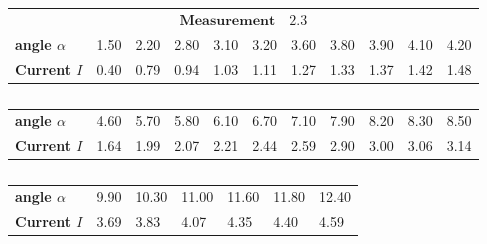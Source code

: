     \begin{table}[htdp]
        \begin{tabular}{|l||p{1.1cm}|p{1.1cm}|p{1.1cm}|p{1.1cm}|p{1.1cm}|p{1.1cm}|p{1.1cm}|p{1.1cm}|p{1.1cm}|p{1.1cm}|}
        \hline
            \multicolumn{11}{|c|}{\cellcolor[RGB]{206,250,201}$
            \mathbf{Measurement \quad 2.3}$} \\
\textbf{angle $\alpha$}& 1.50& 2.20& 2.80& 3.10& 3.20& 3.60& 3.80& 3.90& 4.10& 4.20 \\
\textbf{Current $I$}& 0.40& 0.79& 0.94& 1.03& 1.11& 1.27& 1.33& 1.37& 1.42& 1.48 \\

        \hline
        \end{tabular}
        \begin{tabular}{|l||p{1.1cm}|p{1.1cm}|p{1.1cm}|p{1.1cm}|p{1.1cm}|p{1.1cm}|p{1.1cm}|p{1.1cm}|p{1.1cm}|p{1.1cm}|}
        \hline\textbf{angle $\alpha$}& 4.60& 5.70& 5.80& 6.10& 6.70& 7.10& 7.90& 8.20& 8.30& 8.50 \\
\textbf{Current $I$}& 1.64& 1.99& 2.07& 2.21& 2.44& 2.59& 2.90& 3.00& 3.06& 3.14 \\

        \hline
        \end{tabular}
    \begin{tabular}{|l||p{1.1cm}|p{1.1cm}|p{1.1cm}|p{1.1cm}|p{1.1cm}|p{1.1cm}|}
    \hline\textbf{angle $\alpha$}& 9.90& 10.30& 11.00& 11.60& 11.80& 12.40 \\
\textbf{Current $I$}& 3.69& 3.83& 4.07& 4.35& 4.40& 4.59 \\

    \hline
    \end{tabular}
    \caption{}
    \label{Power05}
    \end{table}

